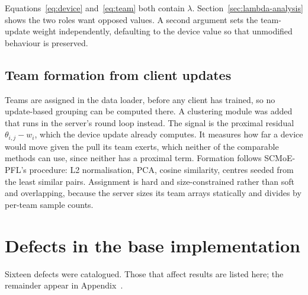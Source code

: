Equations~\eqref{eq:device} and~\eqref{eq:team} both contain $\lambda$.
Section~\ref{sec:lambda-analysis} shows the two roles want opposed values. A
second argument sets the team-update weight independently, defaulting to the
device value so that unmodified behaviour is preserved.

\subsection{Team formation from client updates}

Teams are assigned in the data loader, before any client has trained, so no
update-based grouping can be computed there. A clustering module was added that
runs in the server's round loop instead. The signal is the proximal residual
$\theta_{i,j} - w_i$, which the device update already computes. It measures how
far a device would move given the pull its team exerts, which neither of the
comparable methods can use, since neither has a proximal term. Formation follows
SCMoE-PFL's procedure: L2 normalisation, PCA, cosine similarity, centres seeded
from the least similar pairs. Assignment is hard and size-constrained rather
than soft and overlapping, because the server sizes its team arrays statically
and divides by per-team sample counts.

\section{Defects in the base implementation}
\label{sec:defects}

Sixteen defects were catalogued. Those that affect results are listed here; the
remainder appear in Appendix~.

